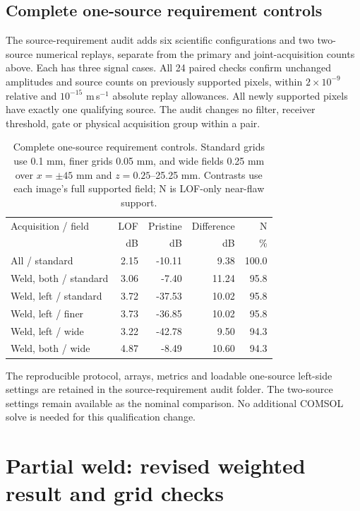 \subsection{Complete one-source requirement controls}
The source-requirement audit adds six scientific configurations and two
two-source numerical replays, separate from the primary and joint-acquisition
counts above. Each has three signal cases. All 24 paired checks confirm
unchanged amplitudes and source counts on previously supported pixels, within
$2\times10^{-9}$ relative and $10^{-15}$ m\,s$^{-1}$ absolute replay allowances.
All newly supported pixels have exactly one qualifying source. The audit
changes no filter, receiver threshold, gate or physical acquisition group
within a pair.
\begin{table}[!htbp]\centering\small
\caption{Complete one-source requirement controls. Standard grids use 0.1 mm,
finer grids 0.05 mm, and wide fields 0.25 mm over $x=\pm45$ mm and
$z=0.25$--25.25 mm. Contrasts use each image's full supported field; N is
LOF-only near-flaw support.}
\begin{tabularx}{\linewidth}{@{}Xrrrr@{}}\toprule
Acquisition / field & LOF & Pristine & Difference & N\\
 & dB & dB & dB & \%\\\midrule
All / standard & 2.15 & -10.11 & 9.38 & 100.0 \\
Weld, both / standard & 3.06 & -7.40 & 11.24 & 95.8 \\
Weld, left / standard & 3.72 & -37.53 & 10.02 & 95.8 \\
Weld, left / finer & 3.73 & -36.85 & 10.02 & 95.8 \\
Weld, left / wide & 3.22 & -42.78 & 9.50 & 94.3 \\
Weld, both / wide & 4.87 & -8.49 & 10.60 & 94.3 \\

\bottomrule\end{tabularx}
\end{table}
The reproducible protocol, arrays, metrics and loadable one-source left-side
settings are retained in the source-requirement audit folder. The two-source
settings remain available as the nominal comparison. No additional COMSOL
solve is needed for this qualification change.


\section{Partial weld: revised weighted result and grid checks}
\label{saftapp:updated}
